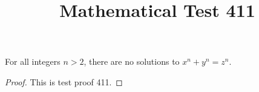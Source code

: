 \documentclass{amsart}
\begin{document}
\title{Mathematical Test 411}
\begin{theorem}
For all integers $n > 2$, there are no solutions to $x^n + y^n = z^n$.
\end{theorem}
\begin{proof}
This is test proof 411.
\end{proof}
\end{document}
